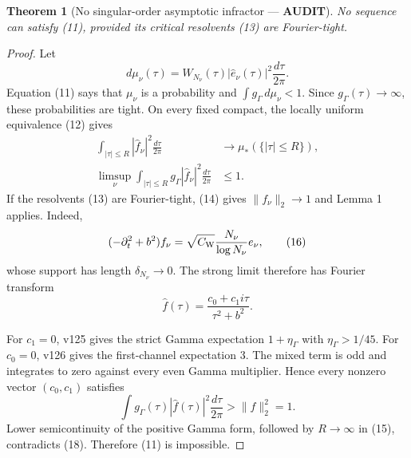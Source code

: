 \documentclass[11pt]{article}
\newcommand{\AUDIT}{\textcolor{orange!70!black}{\textbf{AUDIT}}}
\newtheorem{theorem}{Theorem}
\begin{document}
\begin{theorem}[No singular-order asymptotic infractor --- \AUDIT]
No sequence can satisfy (11), provided its critical resolvents (13) are
Fourier-tight.
\end{theorem}

\begin{proof}
Let
\[
 d\mu_\nu(\tau)=W_{N_\nu}(\tau)|\widehat e_\nu(\tau)|^2
                  \frac{d\tau}{2\pi}.
\]
Equation (11) says that $\mu_\nu$ is a probability and
$\int g_\Gamma\,d\mu_\nu<1$.  Since $g_\Gamma(\tau)\to\infty$, these
probabilities are tight.  On every fixed compact, the locally uniform
equivalence (12) gives
\begin{align}
 \int_{|\tau|\le R}|\widehat f_\nu|^2\frac{d\tau}{2\pi}
 &\longrightarrow\mu_*(\{|\tau|\le R\}),                \tag{14}\\
 \limsup_\nu\int_{|\tau|\le R}g_\Gamma|\widehat f_\nu|^2
                 \frac{d\tau}{2\pi}&\le1.                \tag{15}
\end{align}
If the resolvents (13) are Fourier-tight, (14) gives
$\|f_\nu\|_2\to1$ and Lemma 1 applies.  Indeed,
\begin{equation}
 (-\partial_t^2+b^2)f_\nu
 =\sqrt{C_{\rm W}}\frac{N_\nu}{\log N_\nu}e_\nu,          \tag{16}
\end{equation}
whose support has length $\delta_{N_\nu}\to0$.
The strong limit therefore has Fourier transform
\begin{equation}
 \widehat f(\tau)=\frac{c_0+c_1i\tau}{\tau^2+b^2}.         \tag{17}
\end{equation}

For $c_1=0$, v125 gives the strict Gamma expectation
$1+\eta_\Gamma$ with $\eta_\Gamma>1/45$.  For $c_0=0$, v126 gives the
first-channel expectation $3$.  The mixed term is odd and integrates to
zero against every even Gamma multiplier.  Hence every nonzero vector
$(c_0,c_1)$ satisfies
\begin{equation}
 \int g_\Gamma(\tau)|\widehat f(\tau)|^2\frac{d\tau}{2\pi}
 >\|f\|_2^2=1.                                             \tag{18}
\end{equation}
Lower semicontinuity of the positive Gamma form, followed by
$R\to\infty$ in (15), contradicts (18).
Therefore (11) is impossible.
\end{proof}
\end{document}
